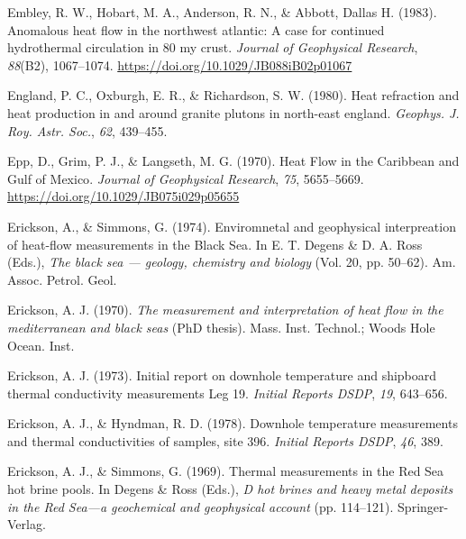 \documentclass[draft,linenumbers]{agujournal2018}
\begin{document}
\leavevmode{}%
Embley, R. W., Hobart, M. A., Anderson, R. N., \& Abbott, Dallas H.
(1983). Anomalous heat flow in the northwest atlantic: A case for
continued hydrothermal circulation in 80 my crust. \emph{Journal of
Geophysical Research}, \emph{88}(B2), 1067--1074.
\url{https://doi.org/10.1029/JB088iB02p01067}

\leavevmode{}%
England, P. C., Oxburgh, E. R., \& Richardson, S. W. (1980). Heat
refraction and heat production in and around granite plutons in
north-east england. \emph{Geophys. J. Roy. Astr. Soc.}, \emph{62},
439--455.

\leavevmode{}%
Epp, D., Grim, P. J., \& Langseth, M. G. (1970). {Heat Flow in the
Caribbean and Gulf of Mexico}. \emph{Journal of Geophysical Research},
\emph{75}, 5655--5669. \url{https://doi.org/10.1029/JB075i029p05655}

\leavevmode{}%
Erickson, A., \& Simmons, G. (1974). Enviromnetal and geophysical
interpreation of heat-flow measurements in the {Black Sea}. In E. T.
Degens \& D. A. Ross (Eds.), \emph{The black sea --- geology, chemistry
and biology} (Vol. 20, pp. 50--62). Am. Assoc. Petrol. Geol.

\leavevmode{}%
Erickson, A. J. (1970). \emph{The measurement and interpretation of heat
flow in the mediterranean and black seas} (PhD thesis). Mass. Inst.
Technol.; Woods Hole Ocean. Inst.

\leavevmode{}%
Erickson, A. J. (1973). Initial report on downhole temperature and
shipboard thermal conductivity measurements {Leg} 19. \emph{Initial
Reports DSDP}, \emph{19}, 643--656.

\leavevmode{}%
Erickson, A. J., \& Hyndman, R. D. (1978). Downhole temperature
measurements and thermal conductivities of samples, site 396.
\emph{Initial Reports DSDP}, \emph{46}, 389.

\leavevmode{}%
Erickson, A. J., \& Simmons, G. (1969). Thermal measurements in the {Red
Sea} hot brine pools. In Degens \& Ross (Eds.), \emph{D hot brines and
heavy metal deposits in the {Red Sea}---a geochemical and geophysical
account} (pp. 114--121). Springer-Verlag.
\end{document}
